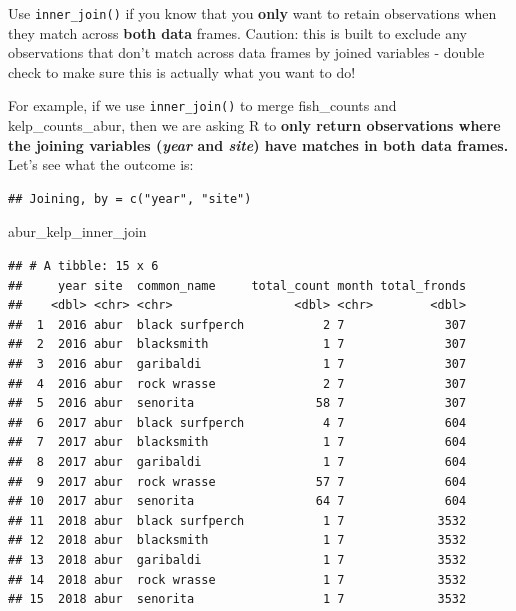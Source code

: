 \documentclass[]{book}
\newenvironment{Shaded}{\begin{snugshade}}{\end{snugshade}}
\newcommand{\KeywordTok}[1]{\textcolor[rgb]{0.13,0.29,0.53}{\textbf{#1}}}
\newcommand{\NormalTok}[1]{#1}
\newcommand{\OperatorTok}[1]{\textcolor[rgb]{0.81,0.36,0.00}{\textbf{#1}}}
\newcommand{\StringTok}[1]{\textcolor[rgb]{0.31,0.60,0.02}{#1}}
\begin{document}
Use \texttt{inner\_join()} if you know that you \textbf{only} want to retain observations when they match across \textbf{both data} frames. Caution: this is built to exclude any observations that don't match across data frames by joined variables - double check to make sure this is actually what you want to do!

For example, if we use \texttt{inner\_join()} to merge fish\_counts and kelp\_counts\_abur, then we are asking R to \textbf{only return observations where the joining variables (\emph{year} and \emph{site}) have matches in both data frames.} Let's see what the outcome is:

\begin{Shaded}
\end{Shaded}

\begin{verbatim}
## Joining, by = c("year", "site")
\end{verbatim}

\begin{Shaded}
\begin{Highlighting}[]
\NormalTok{abur_kelp_inner_join}
\end{Highlighting}
\end{Shaded}

\begin{verbatim}
## # A tibble: 15 x 6
##     year site  common_name     total_count month total_fronds
##    <dbl> <chr> <chr>                 <dbl> <chr>        <dbl>
##  1  2016 abur  black surfperch           2 7              307
##  2  2016 abur  blacksmith                1 7              307
##  3  2016 abur  garibaldi                 1 7              307
##  4  2016 abur  rock wrasse               2 7              307
##  5  2016 abur  senorita                 58 7              307
##  6  2017 abur  black surfperch           4 7              604
##  7  2017 abur  blacksmith                1 7              604
##  8  2017 abur  garibaldi                 1 7              604
##  9  2017 abur  rock wrasse              57 7              604
## 10  2017 abur  senorita                 64 7              604
## 11  2018 abur  black surfperch           1 7             3532
## 12  2018 abur  blacksmith                1 7             3532
## 13  2018 abur  garibaldi                 1 7             3532
## 14  2018 abur  rock wrasse               1 7             3532
## 15  2018 abur  senorita                  1 7             3532
\end{verbatim}
\end{document}
